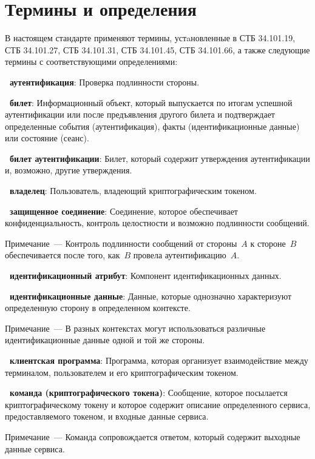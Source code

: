 \chapter{Термины и определения}\label{TERMS}

В настоящем стандарте применяют термины, устaновленные 
в СТБ 34.101.19, СТБ 34.101.27, СТБ 34.101.31, СТБ 34.101.45, 
СТБ 34.101.66, а также следующие термины с соответствующими определениями:

{\bf \thedefctr~аутентификация}:
Проверка подлинности стороны.

{\bf \thedefctr~билет}:
Информационный объект, который выпускается по итогам успешной аутентификации
или после предъявления другого билета и подтверждает определенные 
события (аутентификация), факты (идентификационные данные) 
или состояние (сеанс). 

{\bf \thedefctr~билет аутентификации}:
Билет, который содержит утверждения аутентификации и, возможно, другие 
утверждения. 

{\bf \thedefctr~владелец}:
Пользователь, владеющий криптографическим токеном.

{\bf \thedefctr~защищенное соединение}:
Соединение, которое обеспечивает конфиденциальность, 
контроль целостности и возможно подлинности сообщений. 

\begin{note}
Примечание~--- Контроль подлинности сообщений от стороны~$A$ к стороне~$B$ 
обеспечивается после того, как~$B$ провела аутентификацию~$A$.
\end{note}

{\bf \thedefctr~идентификационный атрибут}:
Компонент идентификационных данных. 

{\bf \thedefctr~идентификационные данные}:
Данные, которые однозначно характеризуют определенную 
сторону в определенном контексте. 

\begin{note}
Примечание~--- В разных контекстах могут использоваться 
различные идентификационные данные одной и той же стороны.
\end{note}

{\bf \thedefctr~клиентская программа}:
Программа, которая организует взаимодействие между терминалом, 
пользователем и его криптографическим токеном.

{\bf \thedefctr~команда (криптографического токена)}:
Сообщение, которое посылается 
криптографическому токену и которое содержит описание определенного 
сервиса, предоставляемого токеном, и входные данные сервиса. 
%
\begin{note}
Примечание~--- Команда сопровождается ответом, который содержит выходные данные 
сервиса.
\end{note}

